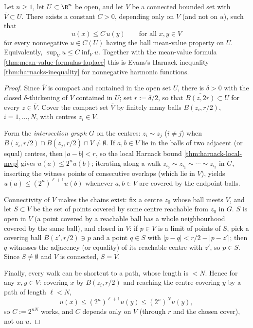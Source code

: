 \begin{theorem}
\label{thm:harnack-global-mvp}
\leanok
Let $n \ge 1$, let $U \subset \R^n$ be open, and let $V$ be a connected bounded set with
$\overline{V} \subset U$. There exists a constant $C > 0$, depending only on $V$ (and not
on $u$), such that
$$u(x) \le C\, u(y) \qquad \text{for all } x, y \in V$$
for every nonnegative $u \in C(U)$ having the ball mean-value property on $U$.
Equivalently, $\sup_V u \le C \inf_V u$. Together with the mean-value formula
\cref{thm:mean-value-formulas-laplace} this is Evans's Harnack inequality
\cref{thm:harnacks-inequality} for nonnegative harmonic functions.
\end{theorem}

\begin{proof}
\leanok
Since $\overline{V}$ is compact and contained in the open set $U$, there is $\delta > 0$
with the closed $\delta$-thickening of $\overline{V}$ contained in $U$; set
$r := \delta/2$, so that $\overline{B(z, 2r)} \subset U$ for every $z \in \overline{V}$.
Cover the compact set $\overline{V}$ by finitely many balls $B(z_i, r/2)$,
$i = 1, \dots, N$, with centres $z_i \in \overline{V}$.

Form the \emph{intersection graph} $G$ on the centres: $z_i \sim z_j$ ($i \neq j$) when
$B(z_i, r/2) \cap B(z_j, r/2) \cap V \neq \emptyset$. If $a, b \in V$ lie in the balls of
two adjacent (or equal) centres, then $|a - b| < r$, so the local Harnack bound
\cref{thm:harnack-local-mvp} gives $u(a) \le 2^n u(b)$; iterating along a walk
$z_{i_0} \sim z_{i_1} \sim \cdots \sim z_{i_\ell}$ in $G$, inserting the witness points of
consecutive overlaps (which lie in $V$), yields
$u(a) \le (2^n)^{\ell+1} u(b)$ whenever $a, b \in V$ are covered by the endpoint balls.

Connectivity of $V$ makes the chains exist: fix a centre $z_0$ whose ball meets $V$, and
let $S \subset V$ be the set of points covered by some centre reachable from $z_0$ in
$G$. $S$ is open in $V$ (a point covered by a reachable ball has a whole neighbourhood
covered by the same ball), and closed in $V$: if $p \in V$ is a limit of points of $S$,
pick a covering ball $B(z', r/2) \ni p$ and a point $q \in S$ with
$|p - q| < r/2 - |p - z'|$; then $q$ witnesses the adjacency (or equality) of its
reachable centre with $z'$, so $p \in S$. Since $S \neq \emptyset$ and $V$ is connected,
$S = V$.

Finally, every walk can be shortcut to a path, whose length is $< N$. Hence for any
$x, y \in V$: covering $x$ by $B(z_{i}, r/2)$ and reaching the centre covering $y$ by a
path of length $\ell < N$,
$$u(x) \le (2^n)^{\ell + 1} u(y) \le (2^n)^N u(y),$$
so $C := 2^{nN}$ works, and $C$ depends only on $V$ (through $r$ and the chosen cover),
not on $u$.
\end{proof}

